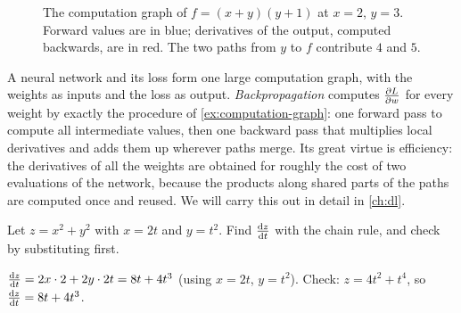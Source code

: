 \begin{figure}[htbp]
\centering
{}
\caption{The computation graph of $f = (x + y)(y + 1)$ at $x = 2$, $y = 3$.
  Forward values are in blue; derivatives of the output, computed backwards,
  are in red. The two paths from $y$ to $f$ contribute $4$ and $5$.}
\label{fig:computation-graph}
\end{figure}

\begin{mlnote}
A neural network and its loss form one large computation graph, with the
weights as inputs and the loss as output. \emph{Backpropagation} computes
$\frac{\partial L}{\partial w}$ for every weight by exactly the procedure of
\cref{ex:computation-graph}: one forward pass to compute all intermediate
values, then one backward pass that multiplies local derivatives and adds them
up wherever paths merge. Its great virtue is efficiency: the derivatives of all
the weights are obtained for roughly the cost of two evaluations of the
network, because the products along shared parts of the paths are computed once
and reused. We will carry this out in detail in \cref{ch:dl}.
\end{mlnote}

\sectionexercises

\begin{exercise}
Let $z = x^2 + y^2$ with $x = 2t$ and $y = t^2$. Find $\frac{\mathrm{d} z}{\mathrm{d} t}$ with the
chain rule, and check by substituting first.
\end{exercise}
\begin{solution}
$\frac{\mathrm{d} z}{\mathrm{d} t} = 2x\cdot2 + 2y\cdot2t = 8t + 4t^3$ (using $x = 2t$, $y = t^2$).
Check: $z = 4t^2 + t^4$, so $\frac{\mathrm{d} z}{\mathrm{d} t} = 8t + 4t^3$.
\end{solution}

